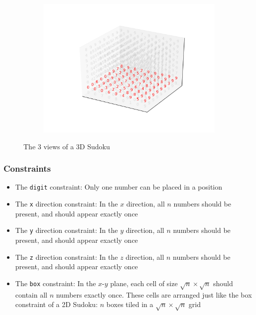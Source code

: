 \documentclass{beamer}
\begin{document}
\begin{frame}
\begin{figure}
	
	\begin{subfigure}[b]{0.4\textwidth}
		\includegraphics[width=\textwidth]{example_orientation_2}        
	\end{subfigure}
	\caption*{The 3 views of a 3D Sudoku}\label{fig:example_sudoku}
\end{figure}
\end{frame}


\begin{frame}
\frametitle{Constraints}
\begin{itemize}
\item The \texttt{digit} constraint: Only one number can be placed in a position \pause
\item The \texttt{x} direction constraint:  In the $x$ direction, all $n$ numbers should be present, and should appear exactly once \pause
\item The \texttt{y} direction constraint: In the $y$ direction, all $n$ numbers should be present, and should appear exactly once \pause
\item The \texttt{z} direction constraint: In the $z$ direction, all $n$ numbers should be present, and should appear exactly once \pause
\item The \texttt{box} constraint: In the $x$-$y$ plane, each cell of size $\sqrt{n} \times \sqrt{n}$ should contain all $n$ numbers exactly once. These cells are arranged just like the box constraint of a 2D Sudoku: $n$ boxes tiled in a $\sqrt{n} \times \sqrt{n}$ grid 
\end{itemize}
\end{frame}
\end{document}

